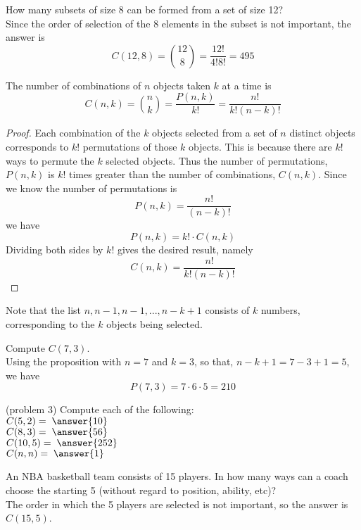 \documentclass[handout]{ximera}
\begin{document}
\begin{example}[example 2]
How many subsets of size 8 can be formed from a set of size 12?\\
Since the order of selection of the 8 elements in the subset is not important, the answer is 
\[
C(12,8) = \binom{12}{8} = \frac{12!}{4!8!} =  495
\]
\end{example}
\begin{proposition}
The number of combinations of $n$ objects taken $k$ at a time is
\[
C(n,k) = \binom{n}{k} = \frac{P(n,k)}{k!} = \frac{n!}{k!(n-k)!}
\]

\end{proposition}
\begin{proof}
Each combination of the $k$ objects selected from a set of $n$ distinct objects 
corresponds to $k!$ permutations of those $k$ objects.  
This is because there are $k!$ ways to permute the $k$ selected objects.
Thus the number of permutations, $P(n,k)$ is $k!$ times greater than the 
number of combinations, $C(n,k)$. Since we know the number of permutations is 
\[
P(n,k) = \frac{n!}{(n-k)!}
\]
we have
\[
P(n,k) = k!\cdot C(n,k)
\]
Dividing both sides by $k!$ gives the desired result, namely
\[
C(n,k) = \frac{n!}{k!(n-k)!}
\]


\end{proof}
\begin{remark}
Note that the list $n, n-1, n-1, ..., n-k+1$ consists of $k$ numbers, corresponding to the $k$ objects being selected.
\end{remark}

\begin{example}[example 3]
Compute $C(7, 3)$.\\
Using the proposition with $n = 7$ and $k = 3$, so that, $n-k+1 = 7-3+1 = 5$, we have
\[
P(7,3) = 7 \cdot 6 \cdot 5 = 210
\]
\end{example}


\begin{problem}(problem 3)
Compute each of the following:\\
$C(5,2) = \; \answer{10}$\\
$C(8,3) = \; \answer{56}$\\
$C(10,5) = \; \answer{252}$\\
$C(n,n) = \; \answer{1}$
\end{problem}



\begin{example}[example 4]
An NBA basketball team consists of 15 players.  In how many ways can a coach choose the 
starting 5 (without regard to position, ability, etc)?\\
The order in which the 5 players are selected is not important, so the answer is $C(15, 5)$.
\end{example}
\end{document}
